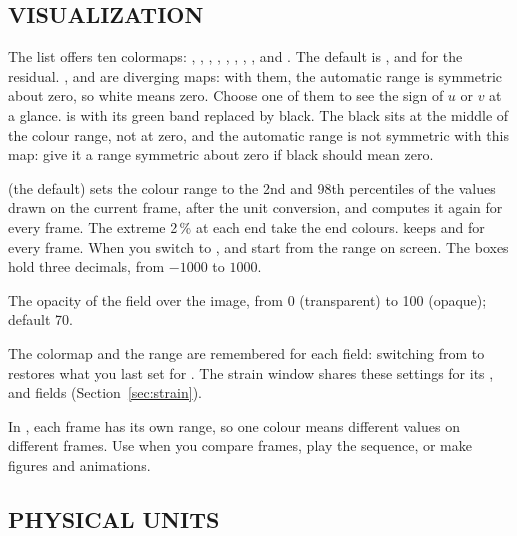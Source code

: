 \subsection{VISUALIZATION}

\begin{description}[leftmargin=1.2cm,style=nextline]
  \item[Colormap]
    The list offers ten colormaps: , , , ,
    , , , ,  and
    . The default is
    , and  for the residual. ,  and
     are diverging maps: with them, the automatic range is symmetric about zero,
    so white means zero. Choose one of them to see the sign of $u$ or $v$ at a glance.
     is  with its green band replaced by black. The black sits at
    the middle of the colour range, not at zero, and the automatic range is not symmetric with
    this map: give it a  range symmetric about zero if black should mean zero.
  \item[Range]
     (the default) sets the colour range to the 2nd and 98th percentiles of the values
    drawn on the current frame, after the unit conversion, and computes it again for every frame.
    The extreme 2\,\% at each end take the end colours.  keeps  and 
    for every frame. When you switch to ,  and  start from the range
    on screen. The boxes hold three decimals, from $-1000$ to $1000$.
  \item[Opacity]
    The opacity of the field over the image, from 0 (transparent) to 100 (opaque); default 70.
\end{description}

The colormap and the range are remembered for each field: switching from  to
 restores what you last set for . The strain window shares these settings
for its ,  and  fields (Section~\ref{sec:strain}).

\begin{tipbox}
In , each frame has its own range, so one colour means different values on different
frames. Use  when you compare frames, play the sequence, or make figures and
animations.
\end{tipbox}

\subsection{PHYSICAL UNITS}
\label{sec:physical-units}

